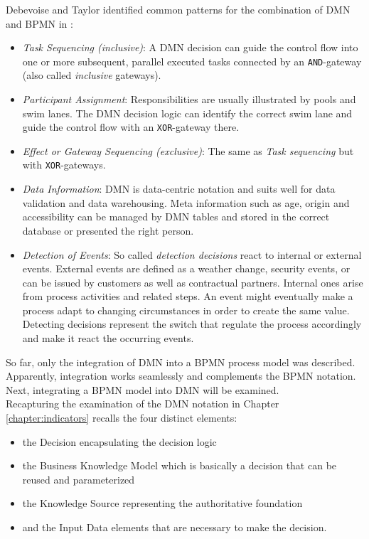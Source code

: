 Debevoise and Taylor identified common patterns for the combination of DMN and BPMN in \cite{DMNmicroguide}:
\begin{itemize}
\item \textit{Task Sequencing (inclusive)}: A DMN decision can guide the control flow into one or more subsequent, parallel executed tasks connected by an \texttt{AND}-gateway (also called \textit{inclusive} gateways). 
\item \textit{Participant Assignment}: Responsibilities are usually illustrated by pools and swim lanes. The DMN decision logic can identify the correct swim lane and guide the control flow with an \texttt{XOR}-gateway there.
\item \textit{Effect or Gateway Sequencing (exclusive)}: The same as \textit{Task sequencing} but with \texttt{XOR}-gateways.
\item \textit{Data Information}: DMN is data-centric notation and suits well for data validation and data warehousing. Meta information such as age, origin and accessibility can be managed by DMN tables and stored in the correct database or presented the right person. 
\item \textit{Detection of Events}:  So called \textit{detection decisions} \cite{DMNmicroguide} react to internal or external events. External events are defined as a weather change, security events, or can be issued by customers as well as contractual partners. Internal ones arise from process activities and related steps. An event might eventually make a process adapt to changing circumstances in order to create the same value. Detecting decisions represent the switch that regulate the process accordingly and make it react the occurring events. 
\end{itemize}

So far, only the integration of DMN into a BPMN process model was described. Apparently, integration works seamlessly and complements the BPMN notation. Next, integrating a BPMN model into DMN will be examined. \\
Recapturing the examination of the DMN notation in Chapter \ref{chapter:indicators} recalls the four distinct elements: 
\begin{itemize}
\item the Decision encapsulating the decision logic
\item the Business Knowledge Model which is basically a decision that can be reused and parameterized \cite{DMNmicroguide}
\item the Knowledge Source representing the authoritative foundation 
\item and the Input Data elements that are necessary to make the decision.
\end{itemize}

